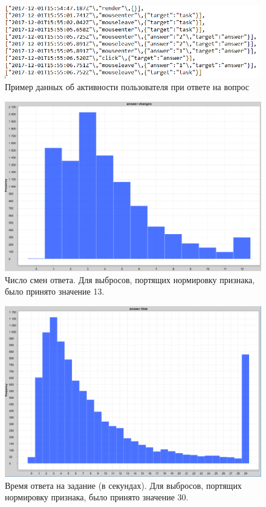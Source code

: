 \documentclass[specification,annotation,times]{itmo-student-thesis}
\begin{document}
\begin{figure}
  \includegraphics[scale=0.5]{activity.PNG}
  \caption{Пример данных об активности пользователя при ответе на вопрос}
  \label{fig:activity}
\end{figure}

\begin{figure}
  \includegraphics[scale=0.5]{answer_changes.PNG}
  \caption{Число смен ответа. Для выбросов, портящих нормировку признака, было принято значение 13.}
  \label{fig:answer_changes}
\end{figure}

\begin{figure}
  \includegraphics[scale=0.5]{answer_time.PNG}
  \caption{Время ответа на задание (в секундах). Для выбросов, портящих нормировку признака, было принято значение 30.}
  \label{fig:answer_time}
\end{figure}
\end{document}
